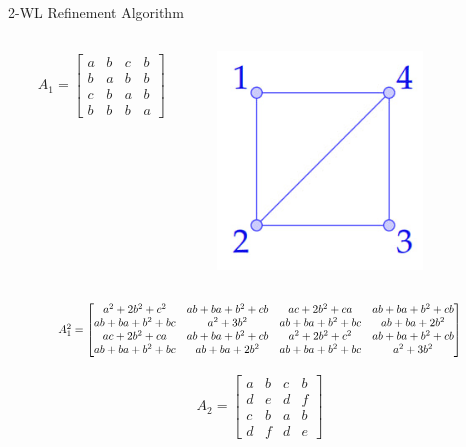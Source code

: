 \documentclass{beamer}
\begin{document}
\begin{frame}{2-WL Refinement Algorithm}
    \begin{columns}
        \begin{column}{0.7\textwidth}
        \begin{align*}
            A_1 = \begin{bmatrix}
                a&b&c&b\\
                b&a&b&b\\
                c&b&a&b\\
                b&b&b&a
            \end{bmatrix}
        \end{align*}
        \end{column}

        \begin{column}{0.3\textwidth}
            \centering
            \includegraphics[width=0.7\textwidth]{slides/pic_1.jpg}
        \end{column}
    \end{columns}
    
    \vspace{1em}
    \[
    \scalebox{0.8}{
    $
        A_1^2 = \begin{bmatrix}
            a^2+2b^2+c^2 & ab+ba+b^2+cb&ac+2b^2+ca & ab+ba+b^2+cb\\
            ab+ba+b^2+bc&a^2+3b^2 & ab+ba+b^2+bc & ab+ba+2b^2\\
            ac+2b^2+ca&ab+ba+b^2+cb&a^2+2b^2+c^2&ab+ba+b^2+cb\\
            ab+ba+b^2+bc&ab+ba+2b^2&ab+ba+b^2+bc&a^2+3b^2
        \end{bmatrix}
    $
    }
    \]

    \vspace{1em}
    \begin{align*}
        A_2 = \begin{bmatrix}
            a&b&c&b\\
            d&e&d&f\\
            c&b&a&b\\
            d&f&d&e
        \end{bmatrix}
    \end{align*}
\end{frame}
\end{document}

